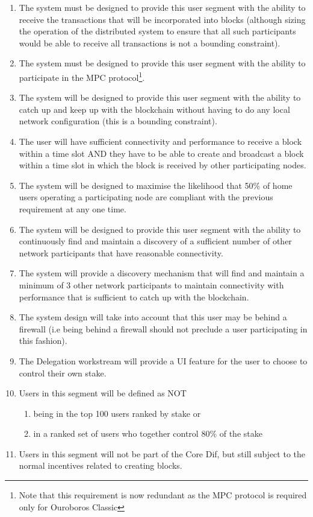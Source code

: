 \documentclass[11pt,a4paper]{article}
\begin{document}
\begin{enumerate}
\item
  The system must be designed to provide this user segment with the
  ability to receive the transactions that will be incorporated into
  blocks (although sizing the operation of the distributed system to
  ensure that all such participants would be able to receive all
  transactions is not a bounding constraint).
\item
  The system must be designed to provide this user segment with the
  ability to participate in the MPC protocol\footnote{Note that this
    requirement is now redundant as the MPC protocol is required only
    for Ouroboros Classic}.
\item
  The system will be designed to provide this user segment with the
  ability to catch up and keep up with the blockchain without having to
  do any local network configuration (this is a bounding constraint).
\item
  The user will have sufficient connectivity and performance to receive
  a block within a time slot AND they have to be able to create and
  broadcast a block within a time slot in which the block is received by
  other participating nodes.
\item
  The system will be designed to maximise the likelihood that 50\% of
  home users operating a participating node are compliant with the
  previous requirement at any one time.
\item
  The system will be designed to provide this user segment with the
  ability to continuously find and maintain a discovery of a sufficient
  number of other network participants that have reasonable
  connectivity.
\item
  The system will provide a discovery mechanism that will find and
  maintain a minimum of 3 other network participants to maintain
  connectivity with performance that is sufficient to catch up with the
  blockchain.
\item
  The system design will take into account that this user may be behind
  a firewall (i.e being behind a firewall should not preclude a user
  participating in this fashion).
\item
  The Delegation workstream will provide a UI feature for the user to
  choose to control their own stake.
\item
  Users in this segment will be defined as NOT

  \begin{enumerate}
  \item
    being in the top 100 users ranked by stake or
  \item
    in a ranked set of users who together control 80\% of the stake
  \end{enumerate}
\item
  Users in this segment will not be part of the Core Dif, but still
  subject to the normal incentives related to creating blocks.
\end{enumerate}
\end{document}
